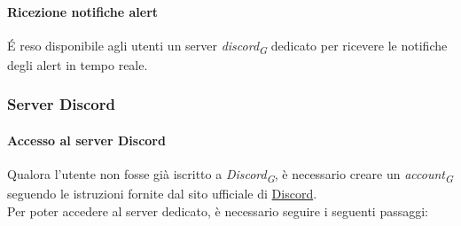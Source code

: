 \paragraph{Ricezione notifiche alert}
É reso disponibile agli utenti un server \textit{discord}\textsubscript{\textit{G}} dedicato per ricevere le notifiche degli alert in tempo reale. \\


\subsubsection{Server Discord}

\paragraph{Accesso al server Discord}
Qualora l'utente non fosse già iscritto a \textit{Discord}\textsubscript{\textit{G}}, è necessario creare un \textit{account}\textsubscript{\textit{G}} seguendo le istruzioni fornite dal sito ufficiale di \href{https://discord.com/}{Discord}. \\
Per poter accedere al server dedicato, è necessario seguire i seguenti passaggi:
